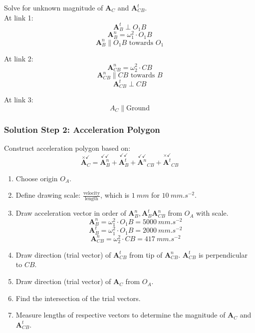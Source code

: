 \documentclass[11pt]{article}
\begin{document}
Solve for unknown magnitude of \(\boldsymbol{A}_C\) and \(\boldsymbol{A}_{CB}^t\).  \\

At link 1:
\[\boldsymbol{A}_B^t \perp O_1 B\]
\[\boldsymbol{A}_B^n = \omega_1^2 \cdot O_1 B\]
\[\boldsymbol{A}_B^n \parallel O_1 B \text{ towards } O_1\]

At link 2:
\[\boldsymbol{A}_{CB}^n = \omega_2^2 \cdot CB\]
\[\boldsymbol{A}_{CB}^n \parallel CB \text{ towards } B\]
\[\boldsymbol{A}_{CB}^t \perp CB\]

At link 3:
\[A_C \parallel \text{Ground}\]

 \newpage
\subsubsection{Solution Step 2: Acceleration Polygon}
\label{sec:orgf496a51}
Construct acceleration polygon based on:
\[\overset{\times \checkmark}{\boldsymbol{A}_C} = \overset{\checkmark \checkmark}{\boldsymbol{A}_B^n} + \overset{\checkmark \checkmark}{\boldsymbol{A}_B^t} + \overset{\checkmark \checkmark}{\boldsymbol{A}^n}_{CB} + \overset{\times \checkmark}{\boldsymbol{A}^t}_{CB}\]

\begin{enumerate}
\item Choose origin \(O_A\).
\item Define drawing scale: \(\frac{\text{velocity}}{\text{length}}\), which is \(\qty{1}{mm}\) for \(\qty{10}{mm.s^{-2}}\).
\item Draw acceleration vector in order of \(\boldsymbol{A}_B^n, \boldsymbol{A}_B^t \boldsymbol{A}_{CB}^n\) from \(O_A\) with scale.
\[\boldsymbol{A}_B^n = \omega_1^2 \cdot O_1 B = \qty{5000}{mm.s^{-2}}\]
\[\boldsymbol{A}_B^t = \omega_1^2 \cdot O_1 B = \qty{2000}{mm.s^{-2}}\]
\[\boldsymbol{A}_{CB}^n = \omega_2^2 \cdot CB = \qty{417}{mm.s^{-2}}\]
\item Draw direction (trial vector) of \(\boldsymbol{A}_{CB}^t\) from tip of \(\boldsymbol{A}_{CB}^n\). \(\boldsymbol{A}_{CB}^t\) is perpendicular to \(CB\).
\item Draw direction (trial vector) of \(\boldsymbol{A}_C\) from \(O_A\).
\item Find the intersection of the trial vectors.
\item Measure lengths of respective vectors to determine the magnitude of \(\boldsymbol{A}_C\) and \(\boldsymbol{A}_{CB}^t\).
\end{enumerate}
\end{document}

